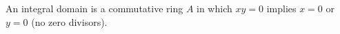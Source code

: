 An integral domain is a commutative ring $A$ in which $xy = 0$ implies $x = 0$ or $y = 0$ (no zero divisors).
